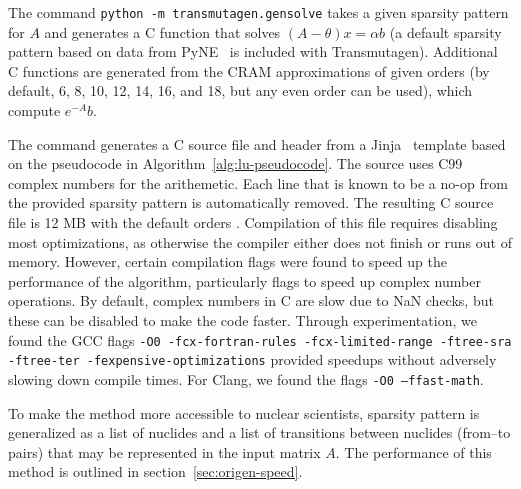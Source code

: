 The command \texttt{python -m transmutagen.gensolve} takes a given sparsity
pattern for $A$ and generates a C function that solves
$(A - \theta)x =\alpha b$ (a default sparsity pattern based on data from
PyNE~\cite{ationneeded} is included with Transmutagen). Additional C functions
are generated from the CRAM approximations of given orders (by default, 6, 8,
10, 12, 14, 16, and 18, but any even order can be used), which compute
$e^{-A}b$.

The command generates a C source file and header from a
Jinja~\cite{ationneeded} template based on the pseudocode in
Algorithm~\ref{alg:lu-pseudocode}. The source uses C99 complex numbers for the
arithemetic. Each line that is known to be a no-op from the provided sparsity
pattern is automatically removed. The resulting C source file is 12 MB with
the default orders . Compilation
of this file requires disabling most optimizations, as otherwise the compiler
either does not finish or runs out of memory. However, certain compilation
flags were found to speed up the performance of the algorithm, particularly
flags to speed up complex number operations. By default, complex numbers in C
are slow due to NaN checks, but these can be disabled to make the code
faster.  Through
experimentation, we found the GCC flags \texttt{-O0 -fcx-fortran-rules
  -fcx-limited-range -ftree-sra -ftree-ter -fexpensive-optimizations} provided
speedups without adversely slowing down compile times. For Clang, we found the
flags \texttt{-O0 --ffast-math}. 

To make the method more accessible to nuclear scientists, sparsity pattern is
generalized as a list of nuclides and a list of transitions between nuclides
(from--to pairs) that may be represented in the input matrix $A$. The
performance of this method is outlined in section~\ref{sec:origen-speed}.
